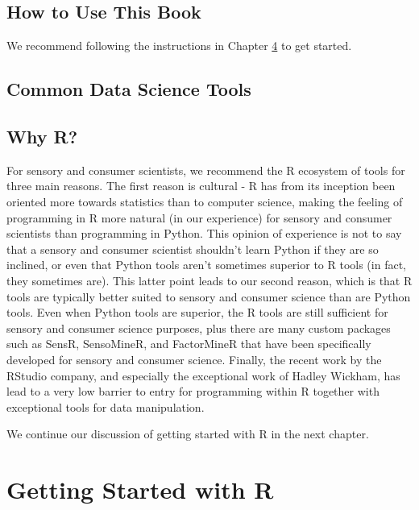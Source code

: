 \documentclass[
]{book}
\begin{document}
\hypertarget{how-to-use-this-book}{%
\section{How to Use This Book}\label{how-to-use-this-book}}

We recommend following the instructions in Chapter \ref{start-R} to get started.

\hypertarget{common-data-science-tools}{%
\section{Common Data Science Tools}\label{common-data-science-tools}}

\hypertarget{why-r}{%
\section{Why R?}\label{why-r}}

For sensory and consumer scientists, we recommend the R ecosystem of tools for three main reasons. The first reason is cultural - R has from its inception been oriented more towards statistics than to computer science, making the feeling of programming in R more natural (in our experience) for sensory and consumer scientists than programming in Python. This opinion of experience is not to say that a sensory and consumer scientist shouldn't learn Python if they are so inclined, or even that Python tools aren't sometimes superior to R tools (in fact, they sometimes are). This latter point leads to our second reason, which is that R tools are typically better suited to sensory and consumer science than are Python tools. Even when Python tools are superior, the R tools are still sufficient for sensory and consumer science purposes, plus there are many custom packages such as SensR, SensoMineR, and FactorMineR that have been specifically developed for sensory and consumer science. Finally, the recent work by the RStudio company, and especially the exceptional work of Hadley Wickham, has lead to a very low barrier to entry for programming within R together with exceptional tools for data manipulation.

We continue our discussion of getting started with R in the next chapter.

\hypertarget{start-R}{%
\chapter{Getting Started with R}\label{start-R}}
\end{document}
